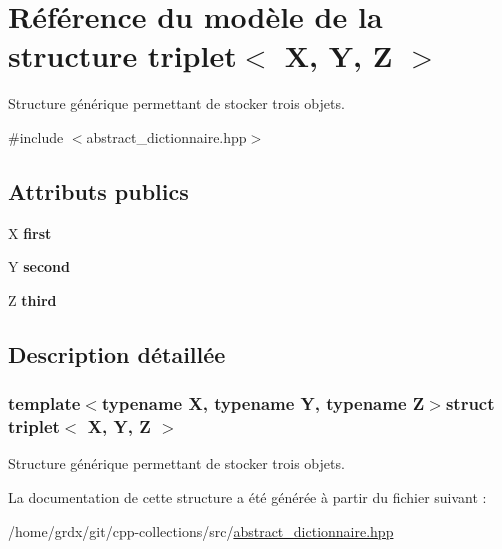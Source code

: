 \hypertarget{structtriplet}{\section{Référence du modèle de la structure triplet$<$ X, Y, Z $>$}
\label{structtriplet}
}


Structure générique permettant de stocker trois objets.  




{\ttfamily \#include $<$abstract\-\_\-dictionnaire.\-hpp$>$}

\subsection*{Attributs publics}
\begin{DoxyCompactItemize}
\item 
\hypertarget{structtriplet_abb054078b3a96581bd22fdcf22b2d9e7}{X {\bfseries first}}\label{structtriplet_abb054078b3a96581bd22fdcf22b2d9e7}

\item 
\hypertarget{structtriplet_ade8bc35f71cffcbe505ede6f1ebfe896}{Y {\bfseries second}}\label{structtriplet_ade8bc35f71cffcbe505ede6f1ebfe896}

\item 
\hypertarget{structtriplet_aabb9092bc2924d46ce68912876e12e3c}{Z {\bfseries third}}\label{structtriplet_aabb9092bc2924d46ce68912876e12e3c}

\end{DoxyCompactItemize}


\subsection{Description détaillée}
\subsubsection*{template$<$typename X, typename Y, typename Z$>$struct triplet$<$ X, Y, Z $>$}

Structure générique permettant de stocker trois objets. 

La documentation de cette structure a été générée à partir du fichier suivant \-:\begin{DoxyCompactItemize}
\item 
/home/grdx/git/cpp-\/collections/src/\hyperlink{abstract__dictionnaire_8hpp}{abstract\-\_\-dictionnaire.\-hpp}\end{DoxyCompactItemize}

